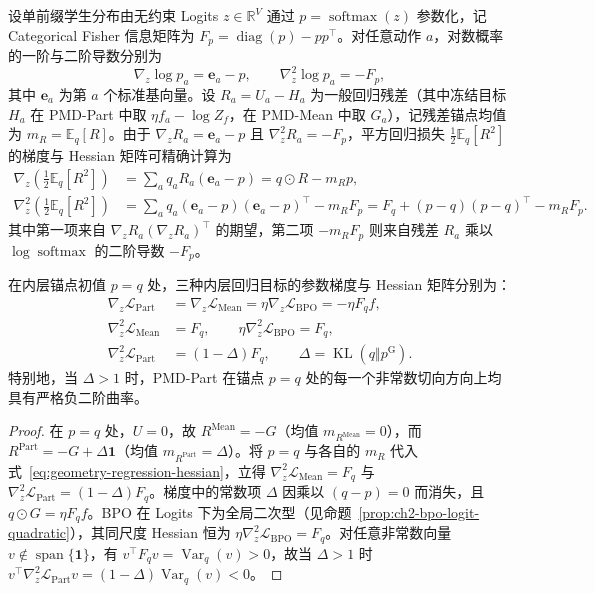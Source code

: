 \documentclass[lang=cn,scheme=chinese,openany]{elegantbook}
\newcommand{\E}{\mathbb E}
\newcommand{\KL}{\operatorname{KL}}
\newcommand{\Var}{\operatorname{Var}}
\newcommand{\R}{\mathbb R}
\begin{document}
设单前缀学生分布由无约束 Logits $z\in\R^V$ 通过 $p=\operatorname{softmax}(z)$ 参数化，记 Categorical Fisher 信息矩阵为 $F_p=\operatorname{diag}(p)-pp^\top$。对任意动作 $a$，对数概率的一阶与二阶导数分别为
\begin{equation}
\nabla_z\log p_a=\mathbf e_a-p,\qquad
\nabla_z^2\log p_a=-F_p,
\end{equation}
其中 $\mathbf e_a$ 为第 $a$ 个标准基向量。设 $R_a=U_a-H_a$ 为一般回归残差（其中冻结目标 $H_a$ 在 PMD-Part 中取 $\eta f_a-\log Z_f$，在 PMD-Mean 中取 $G_a$），记残差锚点均值为 $m_R=\E_q[R]$。由于 $\nabla_z R_a=\mathbf e_a-p$ 且 $\nabla_z^2 R_a=-F_p$，平方回归损失 $\frac12\E_q[R^2]$ 的梯度与 Hessian 矩阵可精确计算为
\begin{align}
\nabla_z\left(\frac12\E_q[R^2]\right)
&=\sum_a q_a R_a(\mathbf e_a-p)=q\odot R-m_R p,\\
\nabla_z^2\left(\frac12\E_q[R^2]\right)
&=\sum_a q_a(\mathbf e_a-p)(\mathbf e_a-p)^\top-m_R F_p
=F_q+(p-q)(p-q)^\top-m_R F_p.
\label{eq:geometry-regression-hessian}
\end{align}
其中第一项来自 $\nabla_z R_a(\nabla_z R_a)^\top$ 的期望，第二项 $-m_R F_p$ 则来自残差 $R_a$ 乘以 $\log\operatorname{softmax}$ 的二阶导数 $-F_p$。

\begin{proposition}[锚点初值处的梯度一致性与曲率分离]
\label{prop:geometry-anchor}
在内层锚点初值 $p=q$ 处，三种内层回归目标的参数梯度与 Hessian 矩阵分别为：
\begin{align}
\nabla_z\mathcal L_{\mathrm{Part}}
&=\nabla_z\mathcal L_{\mathrm{Mean}}
=\eta\nabla_z\mathcal L_{\mathrm{BPO}}=-\eta F_q f,\\
\nabla_z^2\mathcal L_{\mathrm{Mean}}&=F_q,\qquad
\eta\nabla_z^2\mathcal L_{\mathrm{BPO}}=F_q,\\
\nabla_z^2\mathcal L_{\mathrm{Part}}&=(1-\Delta)F_q,\qquad \Delta=\KL(q\Vert p^{\mathrm G}).
\end{align}
特别地，当 $\Delta>1$ 时，PMD-Part 在锚点 $p=q$ 处的每一个非常数切向方向上均具有严格负二阶曲率。
\end{proposition}
\begin{proof}
在 $p=q$ 处，$U=0$，故 $R^{\mathrm{Mean}}=-G$（均值 $m_{R^{\mathrm{Mean}}}=0$），而 $R^{\mathrm{Part}}=-G+\Delta\mathbf1$（均值 $m_{R^{\mathrm{Part}}}=\Delta$）。将 $p=q$ 与各自的 $m_R$ 代入式~\eqref{eq:geometry-regression-hessian}，立得 $\nabla_z^2\mathcal L_{\mathrm{Mean}}=F_q$ 与 $\nabla_z^2\mathcal L_{\mathrm{Part}}=(1-\Delta)F_q$。梯度中的常数项 $\Delta$ 因乘以 $(q-p)=0$ 而消失，且 $q\odot G=\eta F_q f$。BPO 在 Logits 下为全局二次型（见命题~\ref{prop:ch2-bpo-logit-quadratic}），其同尺度 Hessian 恒为 $\eta\nabla_z^2\mathcal L_{\mathrm{BPO}}=F_q$。对任意非常数向量 $v\notin\operatorname{span}\{\mathbf1\}$，有 $v^\top F_q v=\Var_q(v)>0$，故当 $\Delta>1$ 时 $v^\top\nabla_z^2\mathcal L_{\mathrm{Part}}v=(1-\Delta)\Var_q(v)<0$。
\end{proof}
\end{document}
